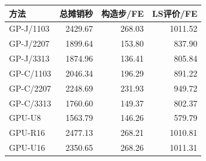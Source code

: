 \begin{tabular}{@{}lrrr@{}}
\toprule
方法 & 总摊销秒 & 构造步/FE & LS评价/FE \\ \midrule
GP-J/1103 & 2429.67 & 268.03 & 1011.52 \\
GP-J/2207 & 1899.64 & 153.80 & 837.90 \\
GP-J/3313 & 1874.96 & 136.41 & 805.84 \\
GP-C/1103 & 2046.34 & 196.29 & 891.22 \\
GP-C/2207 & 2248.69 & 231.93 & 949.72 \\
GP-C/3313 & 1760.60 & 149.37 & 802.37 \\
GPU-U8 & 1563.79 & 146.26 & 579.79 \\
GPU-R16 & 2477.13 & 268.21 & 1010.81 \\
GPU-U16 & 2350.65 & 268.26 & 1011.31 \\
\bottomrule
\end{tabular}
